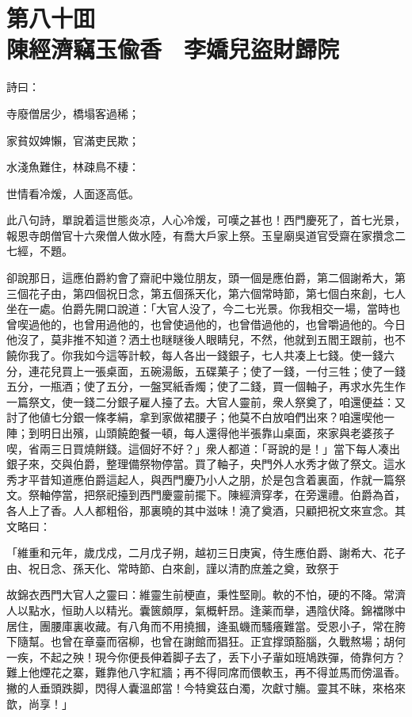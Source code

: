 
\chapter*{第八十囬　\\陳經濟竊玉偸香　李嬌兒盜財歸院}


詩曰：

\begin{myquote}
寺廢僧居少，橋塌客過稀；

家貧奴婢懶，官滿吏民欺；

水淺魚難住，林疎鳥不棲：

世情看冷煖，人面逐高低。
\end{myquote}

此八句詩，單說着這世態炎凉，人心冷煖，可嘆之甚也！西門慶死了，首七光景，報恩寺朗僧官十六衆僧人做水陸，有喬大戶家上祭。玉皇廟吳道官受齋在家攢念二七經，不題。

卻說那日，這應伯爵約會了齋祀中幾位朋友，頭一個是應伯爵，第二個謝希大，第三個花子由，第四個祝日念，第五個孫天化，第六個常時節，第七個白來創，七人坐在一處。伯爵先開口說道：「大官人没了，今二七光景。你我相交一場，當時也曾喫過他的，也曾用過他的，也曾使過他的，也曾借過他的，也曾嚼過他的。今日他沒了，莫非推不知道？洒土也瞇瞇後人眼睛兒，不然，他就到五閻王跟前，也不饒你我了。你我如今這等計較，每人各出一錢銀子，七人共凑上七錢。使一錢六分，連花兒買上一張桌面，五碗湯飯，五碟菓子；使了一錢，一付三牲；使了一錢五分，一瓶酒；使了五分，一盤冥紙香燭；使了二錢，買一個軸子，再求水先生作一篇祭文，使一錢二分銀子雇人擡了去。大官人靈前，衆人祭奠了，咱還便益：又討了他値七分銀一條孝絹，拿到家做裙腰子；他莫不白放咱們出來？咱還喫他一陣；到明日出殯，山頭饒飽餐一頓，每人還得他半張靠山桌面，來家與老婆孩子喫，省兩三日買燒餅錢。這個好不好？」衆人都道：「哥說的是！」當下每人凑出銀子來，交與伯爵，整理備祭物停當。買了軸子，央門外人水秀才做了祭文。這水秀才平昔知道應伯爵這起人，與西門慶乃小人之朋，於是包含着裏面，作就一篇祭文。祭軸停當，把祭祀擡到西門慶靈前擺下。陳經濟穿孝，在旁還禮。伯爵為首，各人上了香。人人都粗俗，那裏曉的其中滋味！澆了奠酒，只顧把祝文來宣念。其文略曰：

\begin{myquote}[\markfont]
「維重和元年，歲戊戍，二月戊子朔，越初三日庚寅，侍生應伯爵、謝希大、花子由、祝日念、孫天化、常時節、白來創，謹以清酌庶羞之奠，致祭于

故錦衣西門大官人之靈曰：維靈生前梗直，秉性堅剛。軟的不怕，硬的不降。常濟人以點水，恒助人以精光。囊篋頗厚，氣概軒昂。逢薬而擧，遇陰伏降。錦襠隊中居住，團腰庫裏收藏。有八角而不用撓摑，逄虱蟣而騷癢難當。受恩小子，常在胯下隨幫。也曾在章臺而宿柳，也曾在謝館而猖狂。正宜撑頭豁腦，久戰熬場；胡何一疾，不起之殃！現今你便長伸着脚子去了，丢下小子軰如班鳩跌彈，倚靠何方？難上他煙花之寨，難靠他八字紅牆；再不得同席而偎軟玉，再不得並馬而傍溫香。撇的人垂頭跌脚，閃得人囊溫郎當！今特奠茲白濁，次獻寸觴。靈其不昧，來格來歆，尚享！」
\end{myquote}


